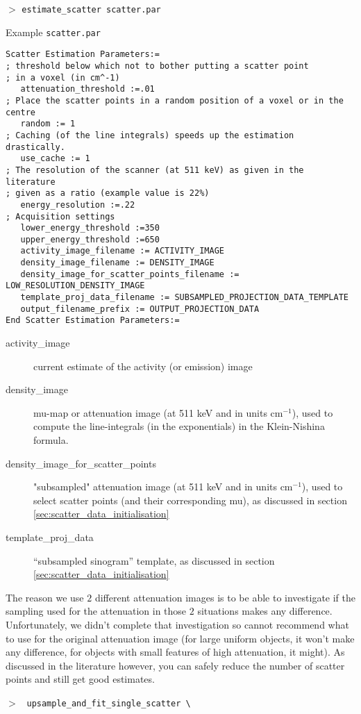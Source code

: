 \documentclass{article}
\newcommand{\cmdline}[1]{\par \noindent $>$ \texttt{#1}\par}
\begin{document}
{{{\cmdline{estimate\_scatter scatter.par}
Example \texttt{scatter.par}
\begin{verbatim}
Scatter Estimation Parameters:=
; threshold below which not to bother putting a scatter point
; in a voxel (in cm^-1)
   attenuation_threshold :=.01
; Place the scatter points in a random position of a voxel or in the centre
   random := 1
; Caching (of the line integrals) speeds up the estimation drastically.
   use_cache := 1
; The resolution of the scanner (at 511 keV) as given in the literature
; given as a ratio (example value is 22%)
   energy_resolution :=.22
; Acquisition settings
   lower_energy_threshold :=350
   upper_energy_threshold :=650
   activity_image_filename := ACTIVITY_IMAGE
   density_image_filename := DENSITY_IMAGE
   density_image_for_scatter_points_filename := LOW_RESOLUTION_DENSITY_IMAGE
   template_proj_data_filename := SUBSAMPLED_PROJECTION_DATA_TEMPLATE
   output_filename_prefix := OUTPUT_PROJECTION_DATA
End Scatter Estimation Parameters:=
\end{verbatim}
\begin{description}
\item[activity\_image]
current estimate of the activity (or emission) image
\item[density\_image] mu-map or attenuation image (at 511 keV and in units cm$^{-1}$),
used to compute the line-integrals (in the exponentials) in the Klein-Nishina formula.
\item[density\_image\_for\_scatter\_points] "subsampled" attenuation image (at 511 keV and in units cm${}^{-1}$), 
used to select scatter points (and their corresponding mu),
as discussed in section \ref{sec:scatter_data_initialisation}
\item[template\_proj\_data]
``subsampled sinogram'' template,
as discussed in section \ref{sec:scatter_data_initialisation}
\end{description}
The reason we use $2$ different attenuation images is to be able to investigate if the sampling used for
the attenuation in those $2$ situations makes any difference. Unfortunately, we didn't complete that
investigation so cannot recommend what to use for the original attenuation image (for large uniform
objects, it won't make any difference, for objects with small features of high attenuation, it might). 
As discussed in the literature however, you can safely reduce the number of scatter points and still get
good estimates. 
\\[1cm]
\cmdline{%
upsample\_and\_fit\_single\_scatter \textbackslash \\
}}}}
\end{document}
